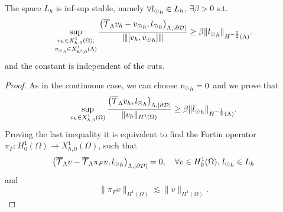 \begin{lemma}\label{lemma:Lh_infsup}
The space $L_h$ is inf-sup stable, namely $\forall {l_{\odot}}_h \in L_h$, $\exists \beta >0$ s.t.
\begin{equation*}
\sup_{\substack{v_h \in X_{h,0}^1(\Omega),\\ {v_{\odot}}_h \in X_{h',0}^1(\Lambda)}} \frac{\left({\overline{\mathcal{T}}_\Lambda} v_h - {v_{\odot}}_h, {l_{\odot}} _h\right)_{\Lambda, |\partial\mathcal{D}|}}{{\left\vert\kern-0.25ex\left\vert\kern-0.25ex\left\vert [v_h, {v_{\odot}}_h] \right\vert\kern-0.25ex\right\vert\kern-0.25ex\right\vert}} \geq \beta \|{l_{\odot}}_h\|_{H^{-\frac 12}(\Lambda)}.
\end{equation*} 
and the constant is independent of the cuts. 
\end{lemma}
\begin{proof}
As in the continuous case, we can choose ${v_{\odot}}_h=0$ and we prove that
\begin{equation*} 
\sup_{v_h \in X_{h,0}^1(\Omega)} \frac{\left({\overline{\mathcal{T}}_\Lambda} v_h ,{l_{\odot}}_h\right)_{\Lambda, |\partial\mathcal{D}|}}{\|v_h\|_{H^1(\Omega)}} \geq \beta \|{l_{\odot}}_h\|_{H^{-\frac 12}(\Lambda)}.
\end{equation*} 
Proving the last inequality it is equivalent to find the Fortin operator $\pi_F: H^1_0(\Omega) \rightarrow X_{h,0}^1(\Omega)$, such that 
\begin{equation*}
\left({\overline{\mathcal{T}}_\Lambda} v - {\overline{\mathcal{T}}_\Lambda} \pi _F v  , {l_{\odot}}_h\right)_{\Lambda, |\partial\mathcal{D}|}=0, \quad \forall v\in H^1_0(\Omega), \, {l_{\odot}}_h \in L_h
\end{equation*} 
and
\begin{equation*}
\|\pi_F v\|_{H^1(\Omega)}\lesssim \|v\|_{H^1(\Omega)}.
\end{equation*} 


\end{proof}
